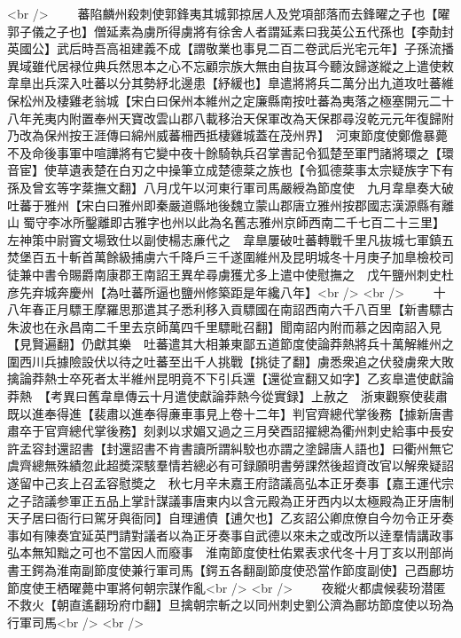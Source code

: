 <br />
　　蕃陷麟州殺刺使郭鋒夷其城郭掠居人及党項部落而去鋒曜之子也【曜郭子儀之子也】僧延素為虜所得虜將有徐舍人者謂延素曰我英公五代孫也【李勣封英國公】武后時吾高祖建義不成【謂敬業也事見二百二卷武后光宅元年】子孫流播異域雖代居禄位典兵然思本之心不忘顧宗族大無由自抜耳今聽汝歸遂縱之上遣使敕韋臯出兵深入吐蕃以分其勢紓北邊患【紓緩也】臯遣將將兵二萬分出九道攻吐蕃維保松州及棲雞老翁城【宋白曰保州本維州之定廉縣南按吐蕃為夷落之極塞開元二十八年羌夷内附置奉州天寶改雲山郡八載移治天保軍改為天保郡尋沒乾元元年復歸附乃改為保州按王涯傳曰綿州威蕃柵西抵棲雞城蓋在茂州界】　河東節度使鄭儋暴薨不及命後事軍中喧譁將有它變中夜十餘騎執兵召掌書記令狐楚至軍門諸將環之【環音宦】使草遺表楚在白刃之中操筆立成楚德棻之族也【令狐德棻事太宗疑族字下有孫及曾玄等字棻撫文翻】八月戊午以河東行軍司馬嚴綬為節度使　九月韋臯奏大破吐蕃于雅州【宋白曰雅州即秦嚴道縣地後魏立蒙山郡唐立雅州按郡國志漢源縣有離山蜀守李冰所鑿離即古雅字也州以此為名舊志雅州京師西南二千七百二十三里】　左神策中尉竇文場致仕以副使楊志亷代之　韋臯屢破吐蕃轉戰千里凡抜城七軍鎮五焚堡百五十斬首萬餘級捕虜六千降戶三千遂圍維州及昆明城冬十月庚子加臯檢校司徒兼中書令賜爵南康郡王南詔王異牟尋虜獲尤多上遣中使慰撫之　戊午鹽州刺史杜彦先弃城奔慶州【為吐蕃所逼也鹽州修築距是年纔八年】<br />
<br />
　　十八年春正月驃王摩羅思那遣其子悉利移入貢驃國在南詔西南六千八百里【新書驃古朱波也在永昌南二千里去京師萬四千里驃毗召翻】聞南詔内附而慕之因南詔入見【見賢遍翻】仍獻其樂　吐蕃遣其大相兼東鄙五道節度使論莽熱將兵十萬解維州之圍西川兵據險設伏以待之吐蕃至出千人挑戰【挑徒了翻】虜悉衆追之伏發虜衆大敗擒論莽熱士卒死者太半維州昆明竟不下引兵還【還從宣翻又如字】乙亥臯遣使獻論莽熱　【考異曰舊韋臯傳云十月遣使獻論莽熱今從實録】上赦之　浙東觀察使裴肅既以進奉得進【裴肅以進奉得亷車事見上卷十二年】判官齊總代掌後務【據新唐書肅卒于官齊總代掌後務】刻剥以求媚又過之三月癸酉詔擢總為衢州刺史給事中長安許孟容封還詔書【封還詔書不肯書讀所謂糾駮也亦謂之塗歸唐人語也】曰衢州無它虞齊總無殊績忽此超奬深駭羣情若總必有可録願明書勞課然後超資改官以解衆疑詔遂留中己亥上召孟容慰奬之　秋七月辛未嘉王府諮議高弘本正牙奏事【嘉王運代宗之子諮議参軍正五品上掌計謀議事唐東内以含元殿為正牙西内以太極殿為正牙唐制天子居曰衙行曰駕牙與衙同】自理逋債【逋欠也】乙亥詔公卿庶僚自今勿令正牙奏事如有陳奏宜延英門請對議者以為正牙奏事自武德以來未之或改所以逹羣情講政事弘本無知黜之可也不當因人而廢事　淮南節度使杜佑累表求代冬十月丁亥以刑部尚書王鍔為淮南副節度使兼行軍司馬【鍔五各翻副節度使恐當作節度副使】己酉鄜坊節度使王栖曜薨中軍將何朝宗謀作亂<br />
<br />
　　夜縱火都虞候裴玢潜匿不救火【朝直遙翻玢府巾翻】旦擒朝宗斬之以同州刺史劉公濟為鄜坊節度使以玢為行軍司馬<br />
<br />
